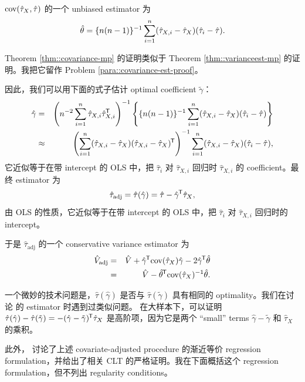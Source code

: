 \begin{theorem}\label{thm::covariance-mp}
$\textup{cov}( \hat{\tau}_X ,  \hat{\tau}  )$ 的一个 unbiased estimator 为
$$
\hat{\theta} = \{n(n-1)  \}^{-1} \sum_{i=1}^n ( \hat{\tau}_{X,i}  -  \hat{\tau}_{X} ) (   \hat{\tau}_i -  \hat{\tau}   ).
$$
\end{theorem}

Theorem \ref{thm::covariance-mp} 的证明类似于 Theorem \ref{thm::varianceest-mp} 的证明。我把它留作 Problem \ref{para::covariance-est-proof}。


因此，我们可以用下面的式子估计 optimal coefficient $\tilde{\gamma}$：
\begin{eqnarray*}
\hat{\gamma} &=&  \left( n^{-2} \sum_{i=1}^n \hat{\tau}_{X,i}   \hat{\tau}_{X,i}  ^{\mkern-1.5mu\mathsf{T}}  \right)^{-1}
\left\{ \{n(n-1)  \}^{-1} \sum_{i=1}^n (\hat{\tau}_{X,i}  -  \hat{\tau}_X )(   \hat{\tau}_i -  \hat{\tau}   ) \right\} \\
&\approx &  \left(  \sum_{i=1}^n(  \hat{\tau}_{X,i}   - \hat{\tau}_X ) ( \hat{\tau}_{X,i}  -  \hat{\tau}_X  )^{\mkern-1.5mu\mathsf{T}}  \right)^{-1}
  \sum_{i=1}^n (\hat{\tau}_{X,i}  -  \hat{\tau}_X ) (   \hat{\tau}_i -  \hat{\tau}   )  ,
\end{eqnarray*}
它近似等于在带 intercept 的 OLS 中，把 $\hat{\tau}_i $ 对 $\hat{\tau}_{X,i} $ 回归时 $\hat{\tau}_{X,i}$ 的 coefficient。最终 estimator 为
$$
\hat{\tau}_{\text{adj}} = 
\hat{\tau}( \hat{\gamma} ) = \hat{\tau} - \hat{\gamma} ^{\mkern-1.5mu\mathsf{T}} \hat{\tau}_X  ,
$$
由 OLS 的性质，它近似等于在带 intercept 的 OLS 中，把 $\hat{\tau}_i $ 对 $\hat{\tau}_{X,i} $ 回归时的 intercept。


于是 $\hat{\tau}_{\text{adj}} $ 的一个 conservative variance estimator 为
\begin{eqnarray*}
\hat{V} _{\text{adj}} 
&=& 
\hat{V} + \hat \gamma^{\mkern-1.5mu\mathsf{T}} \textup{cov}(\hat{\tau}_X   ) \hat \gamma - 2 \hat \gamma^{\mkern-1.5mu\mathsf{T}} \hat \theta  \\
&=& \hat{V}  - \hat \theta ^{\mkern-1.5mu\mathsf{T}} \textup{cov}(\hat{\tau}_X   ) ^{-1}    \hat \theta .
\end{eqnarray*}


一个微妙的技术问题是，$\hat\tau(\hat\gamma)$ 是否与 $\hat\tau(\tilde\gamma)$ 具有相同的 optimality。我们在讨论 \citet{lin2013} 的 estimator 时遇到过类似问题。
在大样本下，可以证明 $\hat\tau(\hat\gamma) - \hat\tau(\tilde\gamma) =  - (\hat\gamma - \tilde\gamma)^{\mkern-1.5mu\mathsf{T}} \hat{\tau}_X $ 是高阶项，因为它是两个 ``small'' terms $\hat\gamma - \tilde\gamma$ 和 $\hat{\tau}_X$ 的乘积。


此外，\citet{fogarty2018regression} 讨论了上述 covariate-adjusted procedure 的渐近等价 regression formulation，并给出了相关 CLT 的严格证明。我在下面概括这个 regression formulation，但不列出 regularity conditions。


